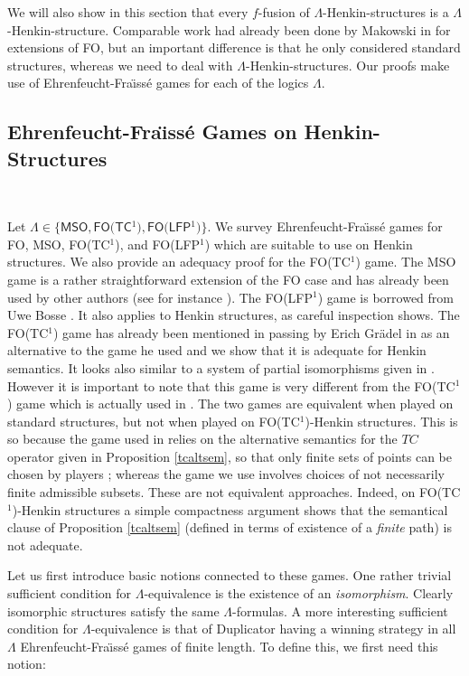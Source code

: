 \documentclass{LMCS}
\newcommand{\fo}{\textsf{FO}\xspace}
\newcommand{\mso}{\textsf{MSO}\xspace}
\newcommand{\fotc}{\textsf{FO(TC$^1$)}\xspace}
\newcommand{\folfp}{\textsf{FO(LFP$^1$)}\xspace}
\begin{document}
We will also show in this section that every $f$-fusion of $\Lambda$-Henkin-structures is a $\Lambda$-Henkin-structure.
Comparable work had already been done by Makowski in \cite{2004}
for extensions of \fo, but an important difference is that he only
considered standard structures, whereas we need to deal with
$\Lambda$-Henkin-structures. Our proofs make use of
Ehrenfeucht-Fra\"{\i}ss\'e games for each of the
logics $\Lambda$. 

\subsection{Ehrenfeucht-Fra\"\i ss\'e Games on Henkin-Structures}\
\label{apb}

\noindent
Let $\Lambda \in \{\mso,\fotc,\folfp\}$. We survey Ehrenfeucht-Fra\"{\i}ss\'e games
for \fo, \mso, \fotc, and \folfp which are suitable to use on Henkin structures.
We also provide an adequacy proof for the \fotc game. 
The \mso game is a rather straightforward
extension of the \fo case and has already been used by other
authors (see for instance \cite{1998}). The \folfp game is
borrowed from Uwe Bosse \cite{736408}. It also applies to Henkin
structures, as careful inspection shows. The \fotc game has
already been mentioned in passing by Erich Gr\"{a}del in \cite{736267}
as an alternative to the game he used and we show that it is
adequate for Henkin semantics. It looks also similar to a system
of partial isomorphisms given in \cite{1992}. However it is
important to note that this game is very different from the
\fotc game which is actually used in \cite{736267}. The two games
are equivalent when played on standard structures, but not when
played on \fotc-Henkin structures. This is so because the game
used in \cite{1992} relies on the alternative semantics for the
$TC$ operator given in Proposition \ref{tcaltsem}, so that only
finite sets of points can be chosen by players ; whereas the game
we use involves choices of not necessarily finite admissible
subsets. These are not equivalent approaches. Indeed, on
\fotc-Henkin structures a simple compactness argument shows that
the semantical clause of Proposition \ref{tcaltsem} (defined in
terms of existence of a \emph{finite} path) is not adequate.



Let us first introduce basic notions connected to these games. One
rather trivial sufficient condition for $\Lambda$-equivalence is
the existence of an \emph{isomorphism}.  Clearly isomorphic
structures satisfy the same $\Lambda$-formulas.  A more
interesting sufficient condition for $\Lambda$-equivalence is that
of Duplicator having a winning strategy in all $\Lambda$
Ehrenfeucht-Fra\"{\i}ss\'e games of finite length. To define this,
we first need this notion:
\end{document}
